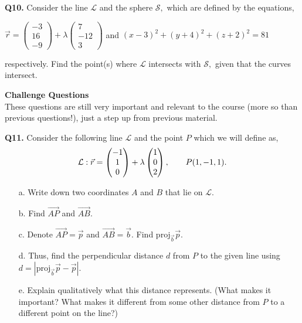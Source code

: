 \documentclass{article}
\begin{document}
\textbf{Q10.} Consider the line $\mathcal{L}$ and the sphere $\mathcal{S},$ which are defined by the equations,
\begin{center}
    $\vec{r} = \begin{pmatrix}
        -3 \\ 16 \\ -9
    \end{pmatrix} + \lambda
    \begin{pmatrix}
        7 \\ -12 \\3
    \end{pmatrix}$ \hspace{0.3cm}and\hspace{0.3cm} $(x-3)^2 + (y+4)^2 + (z+2)^2 =81$ 
\end{center}
respectively.
Find the point(s) where $\mathcal{L}$ intersects with $\mathcal{S},$ given that the curves intersect. \\ 

\begin{center}
    \textbf{Challenge Questions} \\
    These questions are still very important and relevant to the course (more so than previous questions!), just a step up from previous material. \\
\end{center}

\textbf{Q11.} Consider the following line $\mathcal{L}$ and the point $P$ which we will define as,
$$
\mathcal{L}: \vec{r} = 
\begin{pmatrix}
    -1 \\ 1 \\ 0
\end{pmatrix} + \lambda
\begin{pmatrix}
    1 \\ 0 \\ 2
\end{pmatrix}, \hspace{0.7cm}
P(1,-1,1).
$$
\begin{enumerate}
    \item[a.] Write down two coordinates $A$ and $B$ that lie on $\mathcal{L}.$
    \item[b.] Find $\overrightarrow{AP}$ and $\overrightarrow{AB}.$
    \item[c.] Denote $\overrightarrow{AP}=\vec{p}$ and $\overrightarrow{AB}=\vec{b}.$ Find $\text{proj}_{\vec{b}} \vec{p}.$
    \item[d.] Thus, find the perpendicular distance $d$ from $P$ to the given line using $d = \left| \text{proj}_{\vec{b}} \vec{p} - \vec{p} \right|.$
    \item[e.] Explain qualitatively what this distance represents. (What makes it important? What makes it different from some other distance from $P$ to a different point on the line?)
\end{enumerate}
\end{document}
